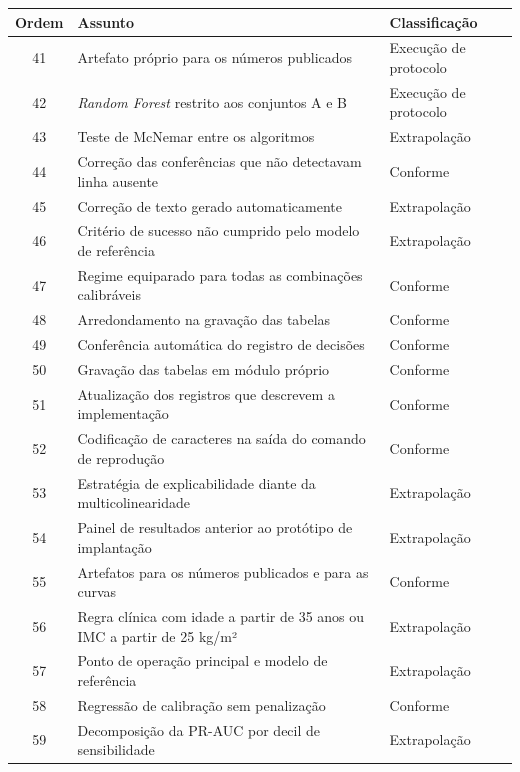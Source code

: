 \begin{quadro}[H]
  \caption{\label{qua:decisoes-3}Índice das decisões de implementação, parte 3 de 3.}
  \small
  \begin{tabular}{|c|p{9.2cm}|p{4.2cm}|}
    \hline
    \textbf{Ordem} & \textbf{Assunto} & \textbf{Classificação} \\ \hline
    41 & Artefato próprio para os números publicados & Execução de protocolo \\ \hline
    42 & \textit{Random Forest} restrito aos conjuntos A e B & Execução de protocolo \\ \hline
    43 & Teste de McNemar entre os algoritmos & Extrapolação \\ \hline
    44 & Correção das conferências que não detectavam linha ausente & Conforme \\ \hline
    45 & Correção de texto gerado automaticamente & Extrapolação \\ \hline
    46 & Critério de sucesso não cumprido pelo modelo de referência & Extrapolação \\ \hline
    47 & Regime equiparado para todas as combinações calibráveis & Conforme \\ \hline
    48 & Arredondamento na gravação das tabelas & Conforme \\ \hline
    49 & Conferência automática do registro de decisões & Conforme \\ \hline
    50 & Gravação das tabelas em módulo próprio & Conforme \\ \hline
    51 & Atualização dos registros que descrevem a implementação & Conforme \\ \hline
    52 & Codificação de caracteres na saída do comando de reprodução & Conforme \\ \hline
    53 & Estratégia de explicabilidade diante da multicolinearidade & Extrapolação \\ \hline
    54 & Painel de resultados anterior ao protótipo de implantação & Extrapolação \\ \hline
    55 & Artefatos para os números publicados e para as curvas & Conforme \\ \hline
    56 & Regra clínica com idade a partir de 35 anos ou IMC a partir de 25 kg/m² & Extrapolação \\ \hline
    57 & Ponto de operação principal e modelo de referência & Extrapolação \\ \hline
    58 & Regressão de calibração sem penalização & Conforme \\ \hline
    59 & Decomposição da PR-AUC por decil de sensibilidade & Extrapolação \\ \hline

\end{tabular}
\end{quadro}

